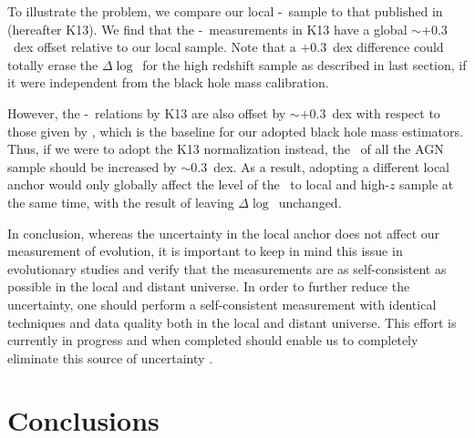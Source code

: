 \documentclass[apj]{emulateapj}
\begin{document}
To illustrate the problem, we compare our local \mbh-\smass\ sample to that published in \citet{Kormendy13} (hereafter K13). We find that the \mbh-\smass\ measurements in K13 have a global $\sim+0.3$~dex offset relative to our local sample. Note that a $+0.3$~dex difference could totally erase the $\Delta\log$\mbh\ for the high redshift sample as described in last section, if it were independent from the black hole mass calibration.

However, the \mbh-\sigstar\ relations by K13 are also offset by  $\sim+0.3$~dex with respect to those given by \citet{Woo2010}, which is the baseline for our adopted black hole mass estimators. Thus, if we were to adopt the K13 normalization instead, the \mbh\ of all the AGN sample should be increased by $\sim$0.3~dex. As a result, adopting a different local anchor would only globally affect the level of the \mbh\ to local and high-$z$ sample at the same time, with the result of leaving $\Delta\log$\mbh\ unchanged.  

In conclusion, whereas the uncertainty in the local anchor does not affect our measurement of evolution, it is important to keep in mind this issue in evolutionary studies and verify that the measurements are as self-consistent as possible in the local and distant universe. In order to further reduce the uncertainty, one should perform a self-consistent measurement with identical techniques and data quality both in the local and distant universe. This effort is currently in progress and when completed should enable us to completely eliminate this source of uncertainty \citep{Bennert11,Harris2012, Bennert2015}.


\section{Conclusions} \label{sec:sum}
\end{document}
